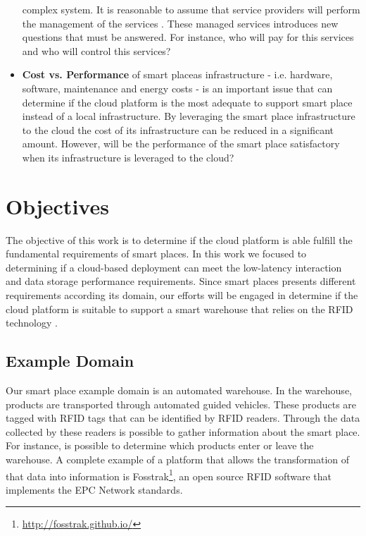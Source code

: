 \begin{itemize}
  complex system. It is reasonable to assume that service providers will perform the management of
  the services . These managed services introduces new questions that must be answered. For instance,
  who will pay for this services and who will control this services?
  \item \textbf{Cost vs. Performance} of smart placeas infrastructure - i.e. hardware, software,
  maintenance and energy costs - is an important issue that can determine if the cloud platform is the most
  adequate to support smart place instead of a local infrastructure. By leveraging the smart
  place infrastructure to the cloud the cost of its infrastructure can be reduced in a significant
  amount. However, will be the performance of the smart place satisfactory when its infrastructure is
  leveraged to the cloud?
\end{itemize}

\section{Objectives}
\label{section:objectives}
The objective of this work is to determine if the cloud platform is able fulfill the fundamental
requirements of smart places. In this work we focused to determining if a cloud-based
deployment can meet the low-latency interaction and data storage performance requirements. Since
smart places presents different requirements according its domain, our efforts will be engaged in
determine if the cloud platform is suitable to support a smart warehouse that relies on the RFID
technology \cite{want2006introduction}.\\

\subsection{Example Domain}
\label{sub:domain}
Our smart place example domain is an automated warehouse. In the warehouse, products are transported
through automated guided vehicles. These products are tagged with \gls{RFID} tags that can be identified
by \gls{RFID} readers.  Through the data collected by these readers is possible to gather information
about the smart place. For instance, is possible to determine which products enter or leave the
warehouse. A complete example of a platform that allows the transformation of that data into
information is Fosstrak\footnote{\url{http://fosstrak.github.io/}}, an open source \gls{RFID}
software that implements the \gls{EPC} Network standards.\\

